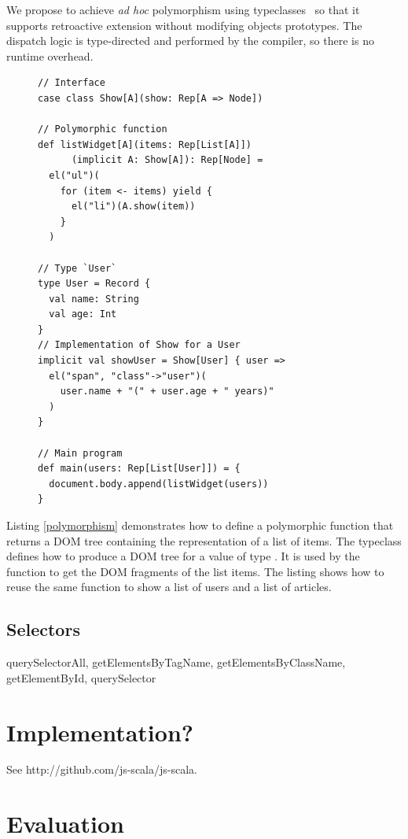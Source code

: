 \documentclass[preprint]{sigplanconf}
\begin{document}
We propose to achieve \emph{ad hoc} polymorphism using
typeclasses~\cite{Wadler89_AdhocPolymorphism,Odersky06_Typeclasses,Oliveira10_Typeclasses} so that it supports
retroactive extension without modifying objects prototypes. The dispatch logic is type-directed and performed by the
compiler, so there is no runtime overhead.

\begin{figure}
\begin{lstlisting}[label=polymorphism,caption=Ad hoc polymorphism using typeclasses]
// Interface
case class Show[A](show: Rep[A => Node])

// Polymorphic function
def listWidget[A](items: Rep[List[A]])
      (implicit A: Show[A]): Rep[Node] =
  el("ul")(
    for (item <- items) yield {
      el("li")(A.show(item))
    }
  )

// Type `User`
type User = Record {
  val name: String
  val age: Int
}
// Implementation of Show for a User
implicit val showUser = Show[User] { user =>
  el("span", "class"->"user")(
    user.name + "(" + user.age + " years)"
  )
}

// Main program
def main(users: Rep[List[User]]) = {
  document.body.append(listWidget(users))
}
\end{lstlisting}
\end{figure}

Listing \ref{polymorphism} demonstrates how to define a polymorphic  function that returns a DOM
tree containing the representation of a list of items. The  typeclass defines how to produce a DOM tree
for a value of type . It is used by the  function to get the DOM fragments of the list
items. The listing shows how to reuse the same  function to show a list of users and a list of
articles.

\subsection{Selectors}

querySelectorAll, getElementsByTagName, getElementsByClassName, getElementById, querySelector

\section{Implementation?}

See http://github.com/js-scala/js-scala.

\section{Evaluation}
\label{validation}
\end{document}
